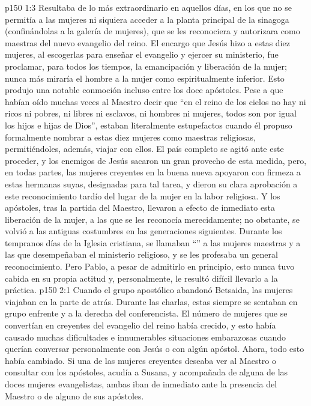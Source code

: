 \vs p150 1:3 Resultaba de lo más extraordinario en aquellos días, en los que no se permitía a las mujeres ni siquiera acceder a la planta principal de la sinagoga (confinándolas a la galería de mujeres), que se les reconociera y autorizara como maestras del nuevo evangelio del reino. El encargo que Jesús hizo a estas diez mujeres, al escogerlas para enseñar el evangelio y ejercer su ministerio, fue proclamar, para todos los tiempos, la emancipación y liberación de la mujer; nunca más miraría el hombre a la mujer como espiritualmente inferior. Esto produjo una notable conmoción incluso entre los doce apóstoles. Pese a que habían oído muchas veces al Maestro decir que “en el reino de los cielos no hay ni ricos ni pobres, ni libres ni esclavos, ni hombres ni mujeres, todos son por igual los hijos e hijas de Dios”, estaban literalmente estupefactos cuando él propuso formalmente nombrar a estas diez mujeres como maestras religiosas, permitiéndoles, además, viajar con ellos. El país completo se agitó ante este proceder, y los enemigos de Jesús sacaron un gran provecho de esta medida, pero, en todas partes, las mujeres creyentes en la buena nueva apoyaron con firmeza a estas hermanas suyas, designadas para tal tarea, y dieron su clara aprobación a este reconocimiento tardío del lugar de la mujer en la labor religiosa. Y los apóstoles, tras la partida del Maestro, llevaron a efecto de inmediato esta liberación de la mujer, a las que se les reconocía merecidamente; no obstante, se volvió a las antiguas costumbres en las generaciones siguientes. Durante los tempranos días de la Iglesia cristiana, se llamaban “” a las mujeres maestras y a las que desempeñaban el ministerio religioso, y se les profesaba un general reconocimiento. Pero Pablo, a pesar de admitirlo en principio, esto nunca tuvo cabida en su propia actitud y, personalmente, le resultó difícil llevarlo a la práctica.
\vs p150 2:1 Cuando el grupo apostólico abandonó Betsaida, las mujeres viajaban en la parte de atrás. Durante las charlas, estas siempre se sentaban en grupo enfrente y a la derecha del conferencista. El número de mujeres que se convertían en creyentes del evangelio del reino había crecido, y esto había causado muchas dificultades e innumerables situaciones embarazosas cuando querían conversar personalmente con Jesús o con algún apóstol. Ahora, todo esto había cambiado. Si una de las mujeres creyentes deseaba ver al Maestro o consultar con los apóstoles, acudía a Susana, y acompañada de alguna de las doces mujeres evangelistas, ambas iban de inmediato ante la presencia del Maestro o de alguno de sus apóstoles.
